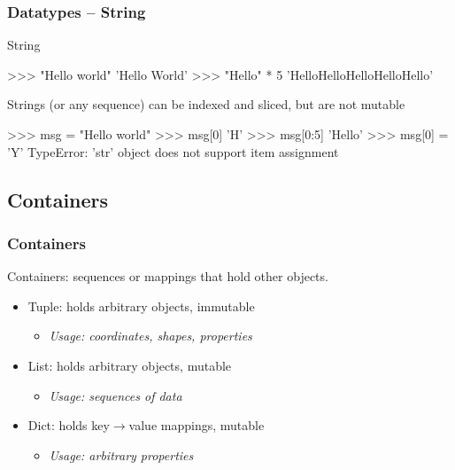 \documentclass[xetex,10pt]{beamer}
\def\spacer{\vspace*{1em}}
\begin{document}
\begin{frame}[fragile]
	\frametitle{Datatypes -- String}

String
\begin{python}
>>> "Hello world"
'Hello World'
>>> "Hello" * 5
'HelloHelloHelloHelloHello'
\end{python}

	\spacer
\pause
	
Strings (or any sequence) can be indexed and sliced, but are not mutable
\begin{python}
>>> msg = "Hello world"
>>> msg[0]
'H'
>>> msg[0:5]
'Hello'
>>> msg[0] = 'Y'
TypeError: 'str' object does not support item assignment
\end{python}
\end{frame}

\subsection{Containers}

\begin{frame}[fragile]
	\frametitle{Containers}

	Containers: sequences or mappings that hold other objects.

	\spacer

	\begin{itemize}
		\item Tuple: holds arbitrary objects, immutable
			\begin{itemize}
			\item \emph{Usage: coordinates, shapes, properties}
			\end{itemize}
		\pause
		\item List: holds arbitrary objects, mutable
			\begin{itemize}
			\item \emph{Usage: sequences of data}
			\end{itemize}
		\pause
		\item Dict: holds key$\rightarrow$value mappings, mutable
			\begin{itemize}
			\item \emph{Usage: arbitrary properties}
			\end{itemize}
	\end{itemize}
	
\end{frame}
\end{document}
